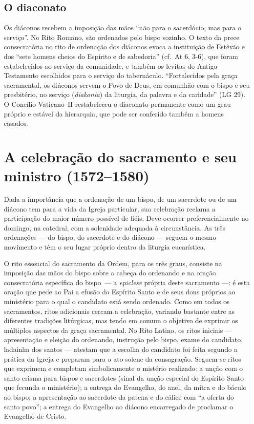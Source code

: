 \subsection*{O diaconato}

Os diáconos recebem a imposição das mãos ``não para o sacerdócio, mas para o serviço''. No Rito Romano, são ordenados pelo bispo sozinho. O texto da prece consecratória no rito de ordenação dos diáconos evoca a instituição de Estêvão e dos ``sete homens cheios do Espírito e de sabedoria'' (cf.~At 6, 3-6), que foram estabelecidos ao serviço da comunidade, e também os levitas do Antigo Testamento escolhidos para o serviço do tabernáculo. ``Fortalecidos pela graça sacramental, os diáconos servem o Povo de Deus, em comunhão com o bispo e seu presbitério, no serviço (\textit{diakonia}) da liturgia, da palavra e da caridade'' (LG 29). O Concílio Vaticano~II restabeleceu o diaconato permanente como um grau próprio e estável da hierarquia, que pode ser conferido também a homens casados.

\section{A celebração do sacramento e seu ministro (1572--1580)}

Dada a importância que a ordenação de um bispo, de um sacerdote ou de um diácono tem para a vida da Igreja particular, sua celebração reclama a participação do maior número possível de fiéis. Deve ocorrer preferencialmente no domingo, na catedral, com a solenidade adequada à circunstância. As três ordenações --- do bispo, do sacerdote e do diácono --- seguem o mesmo movimento e têm o seu lugar próprio dentro da liturgia eucarística.

O rito essencial do sacramento da Ordem, para os três graus, consiste na imposição das mãos do bispo sobre a cabeça do ordenando e na oração consecratória específica do bispo~--- a \emph{epiclese} própria deste sacramento ---: é esta oração que pede ao Pai a efusão do Espírito Santo e de seus dons próprios ao ministério para o qual o candidato está sendo ordenado. Como em todos os sacramentos, ritos adicionais cercam a celebração, variando bastante entre as diferentes tradições litúrgicas, mas tendo em comum o objetivo de exprimir os múltiplos aspectos da graça sacramental. No Rito Latino, os ritos iniciais --- apresentação e eleição do ordenando, instrução pelo bispo, exame do candidato, ladainha dos santos --- atestam que a escolha do candidato foi feita segundo a prática da Igreja e preparam para o ato solene da consagração. Seguem-se ritos que exprimem e completam simbolicamente o mistério realizado: a unção com o santo crisma para bispos e sacerdotes (sinal da unção especial do Espírito Santo que fecunda o ministério); a entrega do Evangelho, do anel, da mitra e do báculo ao bispo; a apresentação ao sacerdote da patena e do cálice com ``a oferta do santo povo''; a entrega do Evangelho ao diácono encarregado de proclamar o Evangelho de Cristo.


